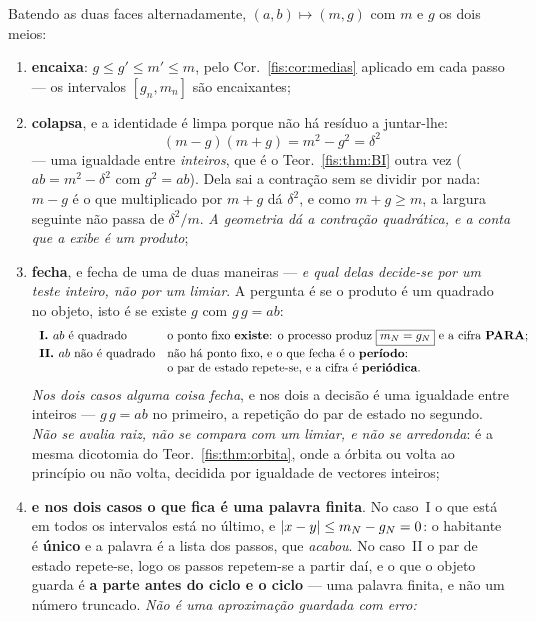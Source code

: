 \documentclass[livro.tex]{subfiles}
\begin{document}
\begin{teorema}[o corte]\label{fis:thm:corte}
Batendo as duas faces alternadamente, $(a,b)\mapsto(m,g)$ com $m$ e $g$ os dois
meios:
\begin{enumerate}\itemsep3pt
\item[(1)] \textbf{encaixa}: $g\le g'\le m'\le m$, pelo Cor.~\ref{fis:cor:medias}
aplicado em cada passo --- os intervalos $[g_{n},m_{n}]$ são encaixantes;
\item[(2)] \textbf{colapsa}, e a identidade é limpa porque não há resíduo a
juntar-lhe:
\[
\boxed{\;(m-g)(m+g)=m^{2}-g^{2}=\delta^{2}\;}
\]
--- uma igualdade entre \emph{inteiros}, que é o Teor.~\ref{fis:thm:BI} outra vez
($ab=m^{2}-\delta^{2}$ com $g^{2}=ab$). Dela sai a contração sem se dividir por
nada: $m-g$ é o que multiplicado por $m+g$ dá $\delta^{2}$, e como $m+g\ge m$, a
largura seguinte não passa de $\delta^{2}/m$. \emph{A geometria dá a contração
quadrática, e a conta que a exibe é um produto};\item[(3)] \textbf{fecha}, e fecha de uma de duas maneiras --- \emph{e qual delas
decide-se por um teste inteiro, não por um limiar}. A pergunta é se o produto é um
quadrado no objeto, isto é se existe $g$ com $g\,g=ab$:
\[
\begin{array}{ll}
\textbf{I. } ab \text{ é quadrado} & \text{o ponto fixo \textbf{existe}: o processo produz } \boxed{m_{N}=g_{N}} \text{ e a cifra \textbf{PARA};}\\[3pt]
\textbf{II. } ab \text{ não é quadrado} & \text{não há ponto fixo, e o que fecha é o \textbf{período}:}\\
& \text{o par de estado repete-se, e a cifra é \textbf{periódica}.}
\end{array}
\]
\emph{Nos dois casos alguma coisa fecha}, e nos dois a decisão é uma igualdade
entre inteiros --- $g\,g=ab$ no primeiro, a repetição do par de estado no
segundo. \emph{Não se avalia raiz, não se compara com um limiar, e não se
arredonda}: é a mesma dicotomia do Teor.~\ref{fis:thm:orbita}, onde a órbita ou
volta ao princípio ou não volta, decidida por igualdade de vectores inteiros;
\item[(4)] \textbf{e nos dois casos o que fica é uma palavra finita}. No caso~I o
que está em todos os intervalos está no último, e $\lvert x-y\rvert\le m_N-g_N=0$: o
habitante é \textbf{único} e a palavra é a lista dos passos, que \emph{acabou}. No
caso~II o par de estado repete-se, logo os passos repetem-se a partir daí, e o que
o objeto guarda é \textbf{a parte antes do ciclo e o ciclo} --- uma palavra
finita, e não um número truncado. \emph{Não é uma aproximação guardada com erro:
}
\end{enumerate}
\end{teorema}
\end{document}
